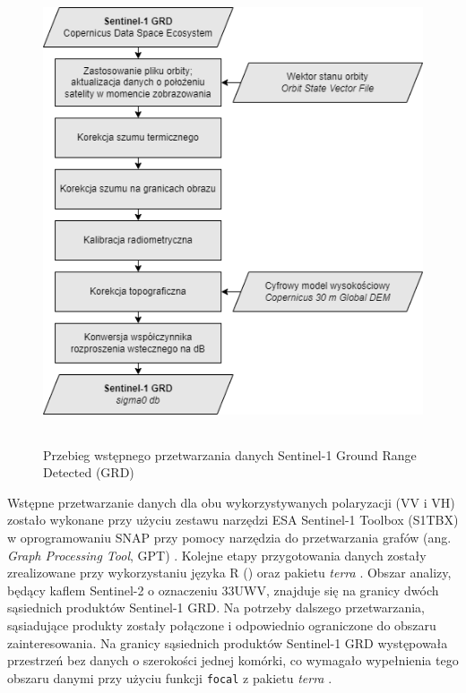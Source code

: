 \documentclass{amuthesis}
\begin{document}
\begin{figure}[t]

{\centering \includegraphics[width=5.01042in,height=5.38542in]{figures/sentinel1_workflow.drawio.png}

}

\caption{\label{fig-rycina-s1-workflow}Przebieg wstępnego przetwarzania
danych Sentinel-1 Ground Range Detected (GRD)}

\end{figure}

Wstępne przetwarzanie danych dla obu wykorzystywanych polaryzacji (VV i
VH) zostało wykonane przy użyciu zestawu narzędzi ESA Sentinel-1 Toolbox
(S1TBX) \autocite{s1tbx} w oprogramowaniu SNAP \autocite{snap} przy
pomocy narzędzia do przetwarzania grafów (ang. \emph{Graph Processing
Tool}, GPT) . Kolejne etapy przygotowania danych zostały zrealizowane
przy wykorzystaniu języka R (\textcite{R-base}) oraz pakietu
\emph{terra} \autocite{R-terra}. Obszar analizy, będący kaflem
Sentinel-2 o oznaczeniu 33UWV, znajduje się na granicy dwóch sąsiednich
produktów Sentinel-1 GRD. Na potrzeby dalszego przetwarzania,
sąsiadujące produkty zostały połączone i odpowiednio ograniczone do
obszaru zainteresowania. Na granicy sąsiednich produktów Sentinel-1 GRD
występowała przestrzeń bez danych o szerokości jednej komórki, co
wymagało wypełnienia tego obszaru danymi przy użyciu funkcji
\texttt{focal} z pakietu \emph{terra} \autocite{R-terra}.
\end{document}
